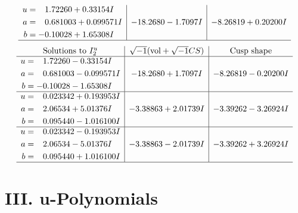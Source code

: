 \documentclass[1p]{elsarticle_modified}
\theoremstyle{definition}
\newcommand{\I}{\sqrt{-1}}
\begin{document}
$$\begin{array}{c|c|c}
\begin{aligned}
u &= \phantom{-}1.72260 + 0.33154 I \\
a &= \phantom{-}0.681003 + 0.099571 I \\
b &= -0.10028 + 1.65308 I\end{aligned}
 & -18.2680 - 1.7097 I & -8.26819 + 0.20200 I\\
 \hline 
 \end{array}$$\newpage$$\begin{array}{c|c|c}  
\text{Solutions to }I^u_{2}& \I (\text{vol} + \sqrt{-1}CS) & \text{Cusp shape}\\
 \hline 
\begin{aligned}
u &= \phantom{-}1.72260 - 0.33154 I \\
a &= \phantom{-}0.681003 - 0.099571 I \\
b &= -0.10028 - 1.65308 I\end{aligned}
 & -18.2680 + 1.7097 I & -8.26819 - 0.20200 I \\ \hline\begin{aligned}
u &= \phantom{-}0.023342 + 0.193953 I \\
a &= \phantom{-}2.06534 + 5.01376 I \\
b &= \phantom{-}0.095440 - 1.016100 I\end{aligned}
 & -3.38863 + 2.01739 I & -3.39262 - 3.26924 I \\ \hline\begin{aligned}
u &= \phantom{-}0.023342 - 0.193953 I \\
a &= \phantom{-}2.06534 - 5.01376 I \\
b &= \phantom{-}0.095440 + 1.016100 I\end{aligned}
 & -3.38863 - 2.01739 I & -3.39262 + 3.26924 I\\
 \hline 
 \end{array}$$\newpage
\newpage\renewcommand{\arraystretch}{1}
\centering \section*{ III. u-Polynomials}
\end{document}
